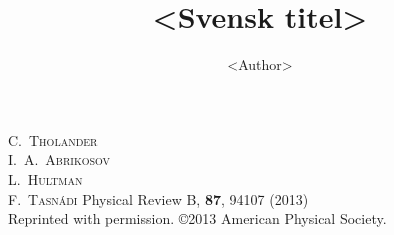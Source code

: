 \documentclass[ english,
                10pt,
                ifm,
                print
                ]{liuthesis}
\title{<Svensk titel>}{<English title>}
\author{<Author>}
\begin{document}
\makeFrontMatter





%

%
%
\printbibliography





\papers

{{\scshape C.~Tholander} \\ {\scshape I.~A.~Abrikosov} \\ {\scshape L.~Hultman}
\\ {\scshape F.~Tasn\'{a}di}}
{Physical Review B, \textbf{87}, 94107 (2013)\\
\vfill Reprinted with permission. \copyright2013 American Physical Society.}
%


%

\end{document}
